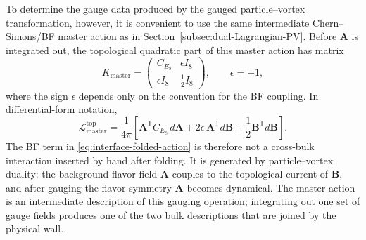 \documentclass[11pt,a4paper]{article}
\numberwithin{equation}{section}
\begin{document}
To determine the gauge data produced by the gauged particle--vortex transformation, however, it is convenient to use the same intermediate Chern--Simons/BF master action as in Section~\ref{subsec:dual-Lagrangian-PV}.  Before $\boldsymbol A$ is integrated out, the topological quadratic part of this master action has matrix
\begin{equation}
  K_{\mathrm{master}}
  =
  \begin{pmatrix}
    C_{E_8} & \epsilon I_8\\
    \epsilon I_8 & \frac12 I_8
  \end{pmatrix},
  \qquad
  \epsilon=\pm1,
  \label{eq:interface-folded-K}
\end{equation}
where the sign $\epsilon$ depends only on the convention for the BF coupling.  In differential-form notation,
\begin{equation}
  \mathcal L_{\mathrm{master}}^{\mathrm{top}}
  =\frac{1}{4\pi}
  \left[
  \boldsymbol A^{\mathsf T}C_{E_8}\,d\boldsymbol A
  +2\epsilon\,\boldsymbol A^{\mathsf T}d\boldsymbol B
  +\frac12\boldsymbol B^{\mathsf T}d\boldsymbol B
  \right].
  \label{eq:interface-folded-action}
\end{equation}
The BF term in \eqref{eq:interface-folded-action} is therefore not a cross-bulk interaction inserted by hand after folding.  It is generated by particle--vortex duality: the background flavor field $\boldsymbol A$ couples to the topological current of $\boldsymbol B$, and after gauging the flavor symmetry $\boldsymbol A$ becomes dynamical.  The master action is an intermediate description of this gauging operation; integrating out one set of gauge fields produces one of the two bulk descriptions that are joined by the physical wall.
\end{document}
